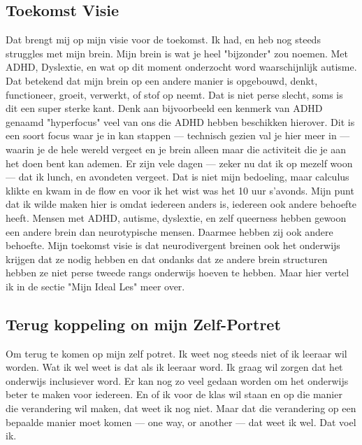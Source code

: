 \documentclass{article}
\begin{document}
        \subsection{Toekomst Visie}
            Dat brengt mij op mijn visie voor de toekomst. Ik had, en heb nog steeds struggles met mijn brein. Mijn brein is wat je heel "bijzonder" zou noemen. Met ADHD, Dyslextie, en wat op dit moment onderzocht word waarschijnlijk autisme. Dat betekend dat mijn brein op een andere manier is opgebouwd, denkt, functioneer, groeit, verwerkt, of stof op neemt\cite{neurodivergent}. 
            \bigskip
            \noindent Dat is niet perse slecht, soms is dit een super sterke kant. Denk aan bijvoorbeeld een kenmerk van ADHD genaamd "hyperfocus"\cite{hyperfocus} veel van ons die ADHD hebben beschikken hierover. Dit is een soort focus waar je in kan stappen — technisch gezien val je hier meer in — waarin je de hele wereld vergeet en je brein alleen maar die activiteit die je aan het doen bent kan ademen. Er zijn vele dagen — zeker nu dat ik op mezelf woon — dat ik lunch, en avondeten vergeet. Dat is niet mijn bedoeling, maar calculus klikte en kwam in de flow en voor ik het wist was het 10 uur s'avonds.
            \bigskip
            \noindent Mijn punt dat ik wilde maken hier is omdat iedereen anders is, iedereen ook andere behoefte heeft. Mensen met ADHD, autisme, dyslextie, en zelf queerness hebben gewoon een andere brein dan neurotypische mensen\cite{ADHD-Neurobiologie}\cite{Autisme}\cite{Dyslextie-breinen}\cite{LGBT-vs-CISHET-breinen}. Daarmee hebben zij ook andere behoefte\cite{ADHD-Bijkomende-problematiek}\cite{ADHD-behoeftes}. Mijn toekomst visie is dat neurodivergent breinen ook het onderwijs krijgen dat ze nodig hebben en dat ondanks dat ze andere brein structuren hebben ze niet perse tweede rangs onderwijs hoeven te hebben. Maar hier vertel ik in de sectie "Mijn Ideal Les" meer over.

        \subsection{Terug koppeling on mijn Zelf-Portret}
            Om terug te komen op mijn zelf potret. Ik weet nog steeds niet of ik leeraar wil worden. Wat ik wel weet is dat als ik leeraar word. Ik graag wil zorgen dat het onderwijs inclusiever word. Er kan nog zo veel gedaan worden om het onderwijs beter te maken voor iedereen. En of ik voor de klas wil staan en op die manier die verandering wil maken, dat weet ik nog niet. Maar dat die verandering op een bepaalde manier moet komen — one way, or another — dat weet ik wel. Dat voel ik.
\end{document}
